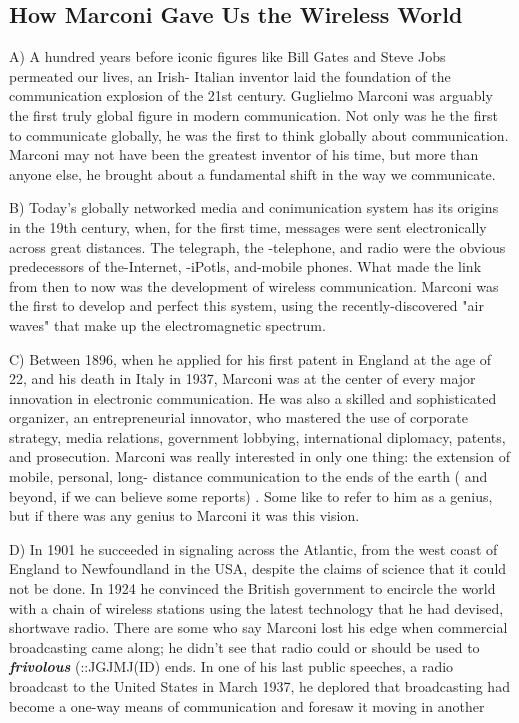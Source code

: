 \documentclass[UTF8,11pt]{ctexart}
\begin{document}
\subsection*{\textbf{How Marconi Gave Us the Wireless World}}


A) A hundred years before iconic figures like Bill Gates and Steve Jobs permeated our lives, an Irish- Italian inventor laid the foundation of the communication explosion of the 21st century. Guglielmo Marconi was arguably the first truly global figure in modern communication. Not only was he the first to communicate globally, he was the first to think globally about communication. Marconi may not have been the greatest inventor of his time, but more than anyone else, he brought about a fundamental shift in the way we communicate.


B) Today's globally networked media and conimunication system has its origins in the 19th century, when, for the first time, messages were sent electronically across great distances. The telegraph, the -telephone, and radio were the obvious predecessors of the-Internet, -iPotls, and-mobile phones. What made the link from then to now was the development of wireless communication. Marconi was the first to develop and perfect this system, using the recently-discovered "air waves" that make up the electromagnetic spectrum.


C) Between 1896, when he applied for his first patent in England at the age of 22, and his death in Italy in 1937, Marconi was at the center of every major innovation in electronic communication. He was also a skilled and sophisticated organizer, an entrepreneurial innovator, who mastered the use of corporate strategy, media relations, government lobbying, international diplomacy, patents, and prosecution. Marconi was really interested in only one thing: the extension of mobile, personal, long- distance communication to the ends of the earth ( and beyond, if we can believe some reports) . Some like to refer to him as a genius, but if there was any genius to Marconi it was this vision.


D) In 1901 he succeeded in signaling across the Atlantic, from the west coast of England to Newfoundland in the USA, despite the claims of science that it could not be done. In 1924 he convinced the British government to encircle the world with a chain of wireless stations using the latest technology that he had devised, shortwave radio. There are some who say Marconi lost his edge when commercial broadcasting came along; he didn't see that radio could or should be used to \textbf{\textit{frivolous }}(::JGJMJ(ID) ends. In one of his last public speeches, a radio broadcast to the United States in March 1937, he deplored that broadcasting had become a one-way means of communication and foresaw it moving in another
\end{document}
